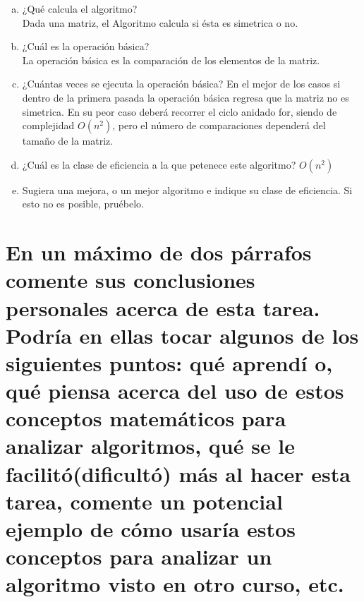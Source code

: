 \documentclass{article}
\begin{document}
\begin{enumerate}[(a)]
\item ¿Qué calcula el algoritmo?\\
  Dada una matriz, el Algoritmo calcula si ésta es simetrica o no.
\item ¿Cuál es la operación básica?\\
  La operación básica es la comparación de los elementos de la matriz.
\item ¿Cuántas veces se ejecuta la operación básica?
  En el mejor de los casos si dentro de la primera pasada la operación básica regresa que la matriz no es simetrica. En su peor caso deberá recorrer el ciclo anidado for, siendo de complejidad $O(n^2)$, pero el número de comparaciones dependerá del tamaño de la matriz.
\item ¿Cuál es la clase de eficiencia a la que petenece este algoritmo?
  $O(n^2)$
\item Sugiera una mejora, o un mejor algoritmo e indique su clase de eficiencia. Si esto no es posible, pruébelo.
\end{enumerate}

\newpage

\section{En un máximo de dos párrafos comente sus conclusiones personales acerca de esta tarea. Podría en ellas tocar algunos de los siguientes puntos: qué aprendí o, qué piensa acerca del uso de estos conceptos matemáticos para analizar algoritmos, qué se le facilitó(dificultó) más al hacer esta tarea, comente un potencial ejemplo de cómo usaría estos conceptos para analizar un algoritmo visto en otro curso, etc.}
\end{document}
